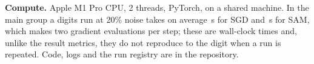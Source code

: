 \textbf{Compute.} Apple M1 Pro CPU, 2 threads, PyTorch, on a shared machine. In the main group a digits run at 20\% noise takes on average \,s for SGD and \,s for SAM, which makes two gradient evaluations per step; these are wall-clock times and, unlike the result metrics, they do not reproduce to the digit when a run is repeated. Code, logs and the run registry are in the repository.

\begin{table}[t]\centering\caption{Hyper-parameters selected on validation (3 tuning seeds).}\label{tab:sel}
\end{table}
